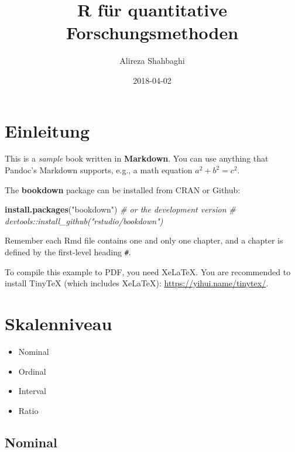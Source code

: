 \documentclass[]{book}
\title{R für quantitative Forschungsmethoden}
\author{Alireza Shahbaghi}
\date{2018-04-02}
\newenvironment{Shaded}{\begin{snugshade}}{\end{snugshade}}
\newcommand{\KeywordTok}[1]{\textcolor[rgb]{0.13,0.29,0.53}{\textbf{#1}}}
\newcommand{\StringTok}[1]{\textcolor[rgb]{0.31,0.60,0.02}{#1}}
\newcommand{\CommentTok}[1]{\textcolor[rgb]{0.56,0.35,0.01}{\textit{#1}}}
\newcommand{\NormalTok}[1]{#1}
\providecommand{\tightlist}{%
  \setlength{\itemsep}{0pt}\setlength{\parskip}{0pt}}
\theoremstyle{definition}
\theoremstyle{definition}
\theoremstyle{definition}
\theoremstyle{remark}
\begin{document}
\maketitle

{
\setcounter{tocdepth}{1}
\tableofcontents
}
\chapter{Einleitung}\label{einleitung}

This is a \emph{sample} book written in \textbf{Markdown}. You can use
anything that Pandoc's Markdown supports, e.g., a math equation
\(a^2 + b^2 = c^2\).

The \textbf{bookdown} package can be installed from CRAN or Github:

\begin{Shaded}
\begin{Highlighting}[]
\KeywordTok{install.packages}\NormalTok{(}\StringTok{"bookdown"}\NormalTok{)}
\CommentTok{# or the development version}
\CommentTok{# devtools::install_github("rstudio/bookdown")}
\end{Highlighting}
\end{Shaded}

Remember each Rmd file contains one and only one chapter, and a chapter
is defined by the first-level heading \texttt{\#}.

To compile this example to PDF, you need XeLaTeX. You are recommended to
install TinyTeX (which includes XeLaTeX):
\url{https://yihui.name/tinytex/}.

\chapter{Skalenniveau}\label{skalenniveau}

\begin{itemize}
\tightlist
\item
  Nominal
\item
  Ordinal
\item
  Interval
\item
  Ratio
\end{itemize}

\section{Nominal}\label{nominal}
\end{document}
